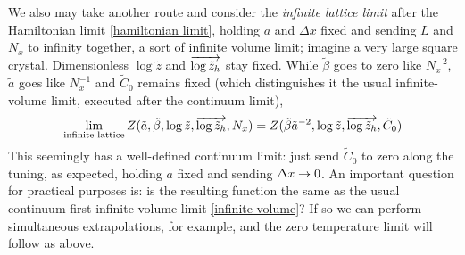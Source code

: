We also may take another route and consider the \emph{infinite lattice limit} after the Hamiltonian limit \eqref{hamiltonian limit}, holding $a$ and $\Delta x$ fixed and sending $L$ and $N_x$ to infinity together, a sort of infinite volume limit; imagine a very large square crystal.
Dimensionless $\log \tilde{z}$ and $\overrightarrow{\log \tilde{z}_h}$ stay fixed.
While $\tilde{\beta}$ goes to zero like $N_x^{-2}$, $\tilde{a}$ goes like $N_x^{-1}$ and $\tilde{C}_0$ remains fixed (which distinguishes it the usual infinite-volume limit, executed after the continuum limit),
\begin{align}
    \lim_{\text{infinite lattice}} Z(\tilde{a}, \tilde{\beta}, \log\tilde{z}, \overrightarrow{\log\tilde{z}_h}, N_x) 
    =
    Z(\tilde{\beta}\tilde{a}^{-2}, \log\tilde{z}, \overrightarrow{\log\tilde{z}_h}, \tilde{C}_0)
\end{align}
This seemingly has a well-defined continuum limit: just send $\tilde{C}_0$ to zero along the tuning, as expected, holding $a$ fixed and sending $\Delta x\rightarrow 0$.
An important question for practical purposes is: is the resulting function the same as the usual continuum-first infinite-volume limit \eqref{infinite volume}?
If so we can perform simultaneous extrapolations, for example, and the zero temperature limit will follow as above.
